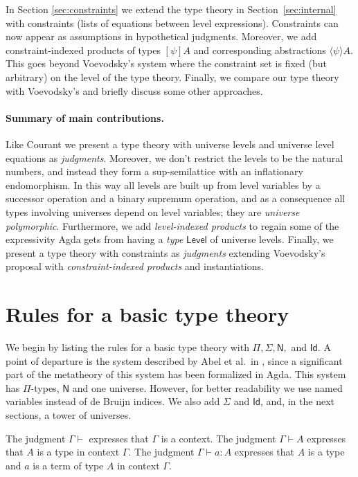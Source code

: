 \documentclass[11pt,a4paper]{article}
\theoremstyle{definition}
\newcommand{\Id}{\mathsf{Id}}
\newcommand{\NN}{\mathsf{N}}
\newcommand{\AgdaLevel}{\mathsf{Level}}
\newcommand{\lam}[1]{{\langle}#1{\rangle}}
\begin{document}
In Section \ref{sec:constraints} we extend the type theory in
Section~\ref{sec:internal} with constraints (lists of equations between level expressions). Constraints can now appear as assumptions in hypothetical judgments. Moreover, we add
constraint-indexed products of types $[\psi]A$ and corresponding
abstractions $\lam{\psi}A$. This goes beyond Voevodsky's system \cite{VV} where the
constraint set is fixed (but arbitrary) on the level of the type theory.
Finally, we %
compare our type theory with Voevodsky's
and briefly discuss some other approaches. 

\paragraph{Summary of main contributions.} 
Like Courant we present a type theory with 
universe levels  and universe level equations as \emph{judgments}. Moreover, we don't restrict the levels to be the natural numbers, and instead they form a sup-semilattice with an inflationary endomorphism. In this way all levels are built up from level variables by a successor operation and a binary supremum operation, and as a consequence all types involving universes depend on level variables; they are {\em universe polymorphic}.
Furthermore, we add 
\emph{level-indexed products} to regain some of the expressivity Agda gets from having a \emph{type} 
$\AgdaLevel$ of universe levels.
Finally, we present a type theory with constraints as \emph{judgments} extending Voevodsky's proposal with \emph{constraint-indexed products} and
instantiations.

\section{Rules for a basic type theory}\label{sec:basic}

We begin by listing the rules for a basic type theory
with $\Pi, \Sigma, \NN,$ and $\Id$. A point of departure is
the system described by Abel et al.\ in \cite{abel18}, since a
significant part of the metatheory of this system has been formalized in Agda.
This system has $\Pi$-types, $\NN$ and one universe.
However, for better readability we use named variables instead
of de Bruijn indices. We also add $\Sigma$ and $\Id$, and,
in the next sections, a tower of universes.

The judgment $\Gamma\vdash$ expresses that $\Gamma$ is a context.
The judgment $\Gamma\vdash A$ expresses that $A$ is a type in context $\Gamma$.
The judgment $\Gamma\vdash a:A$ expresses that $A$ is a type
and $a$ is a term of type $A$ in context $\Gamma$.
\end{document}
